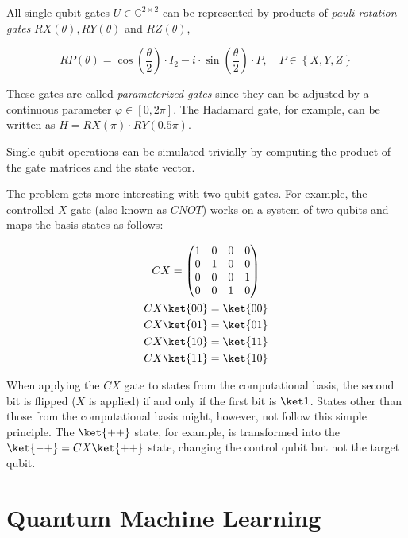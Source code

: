 All single-qubit gates $U \in \mathbb{C}^{2 \times 2}$ can be represented by
products of \emph{pauli rotation gates} $RX(\theta), RY(\theta)$ and
$RZ(\theta)$,

\begin{equation}
    \label{eq:rotational-pauli-gates}
    RP\left(\theta\right) = \cos\left(\frac\theta2\right) \cdot I_2 - i \cdot \sin\left(\frac\theta2\right) \cdot P,\quad
    P \in \left\{X, Y, Z\right\}
\end{equation}

These gates are called \emph{parameterized gates} since they can be adjusted by a
continuous parameter $\varphi \in \left[0, 2\pi\right]$.
The Hadamard gate, for example, can be written as
$H = RX(\pi) \cdot RY(0.5\pi)$.

Single-qubit operations can be simulated trivially by computing the product of
the gate matrices and the state vector.

The problem gets more interesting with two-qubit gates.
For example, the controlled $X$ gate (also known as $CNOT$) works on a system
of two qubits and maps the basis states as follows:

\begin{gather}
    \label{eq:cx-zbasis}
    CX = \begin{pmatrix}
        1&0&0&0\\
        0&1&0&0\\
        0&0&0&1\\
        0&0&1&0
    \end{pmatrix}\\
    CX \ket{00} = \ket{00}\\
    CX \ket{01} = \ket{01}\\
    CX \ket{10} = \ket{11}\\
    CX \ket{11} = \ket{10}
\end{gather}

When applying the $CX$ gate to states from the computational basis, the second
bit is flipped ($X$ is applied) if and only if the first bit is $\ket 1$.
States other than those from the computational basis might, however, not follow
this simple principle.
The $\ket{++}$ state, for example, is transformed into the
$\ket{-+} = CX \ket{++}$ state, changing the control qubit but not the target
qubit.


\section{Quantum Machine Learning}
\label{sec:qml-intro}

